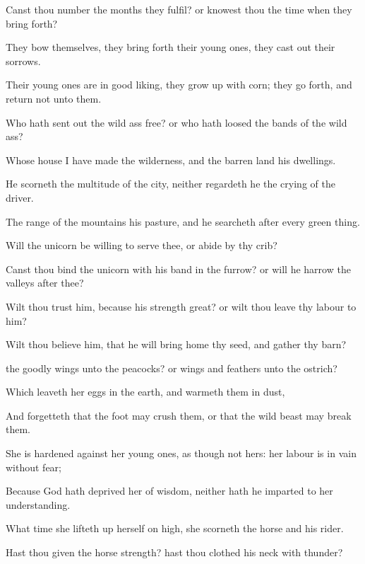 {Canst thou
number the
months
{} they
fulfil? or
knowest thou the
time when they bring
forth?

They
bow themselves, they bring
forth their young
ones, they cast
out their
sorrows.

Their young
ones are in good
liking, they grow
up with
corn; they go
forth, and
return not unto them.

Who hath sent
out the wild
ass
free? or who hath
loosed the
bands of the wild
ass?

Whose
house I have
made the
wilderness, and the
barren land his
dwellings.

He
scorneth the
multitude of the
city, neither
regardeth he the
crying of the
driver.

The
range of the
mountains
{} his
pasture, and he
searcheth
after every green
thing.

Will the
unicorn be
willing to
serve thee, or
abide by thy
crib?

Canst thou
bind the
unicorn with his
band in the
furrow? or will he
harrow the
valleys
after thee?

Wilt thou
trust him, because his
strength
{}
great? or wilt thou
leave thy
labour to him?

Wilt thou
believe him, that he will bring
home thy
seed, and
gather
{} thy
barn?


\par }{\PP {} the
goodly
wings unto the
peacocks? or
wings and
feathers unto the
ostrich?

Which
leaveth her
eggs in the
earth, and
warmeth them in
dust,

And
forgetteth that the
foot may
crush them, or that the
wild
beast may
break them.

She is
hardened against her young
ones, as though
{}
not hers: her
labour is in
vain without
fear;

Because
God hath
deprived her of
wisdom, neither hath he
imparted to her
understanding.

What
time she lifteth
up herself on
high, she
scorneth the
horse and his
rider.


\par }{\PP {}Hast thou
given the
horse
strength? hast thou
clothed his
neck with
thunder?

}
